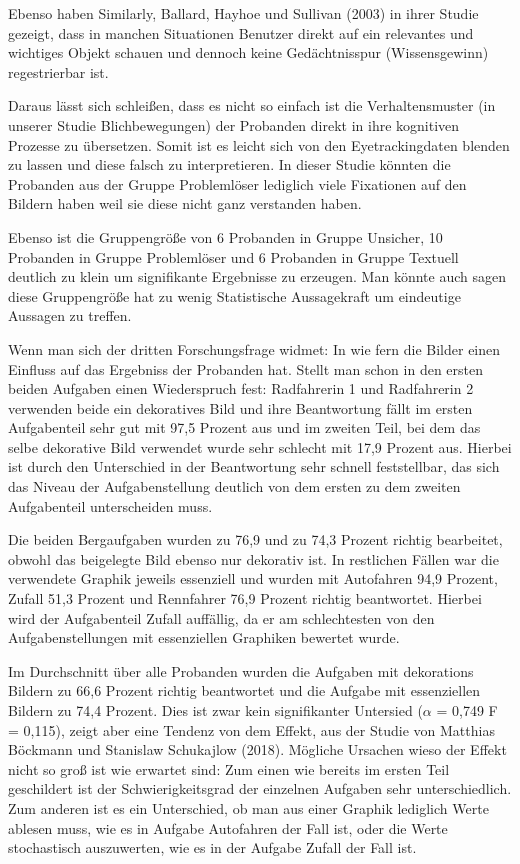 Ebenso haben Similarly, Ballard, Hayhoe und Sullivan (2003) in ihrer Studie gezeigt, dass in manchen Situationen Benutzer direkt auf ein relevantes und wichtiges Objekt schauen und dennoch keine Gedächtnisspur (Wissensgewinn) regestrierbar ist. 

Daraus lässt sich schleißen, dass es nicht so einfach ist die Verhaltensmuster (in unserer Studie Blichbewegungen) der Probanden direkt in ihre kognitiven Prozesse zu übersetzen. Somit ist es leicht sich von den Eyetrackingdaten blenden zu lassen und diese falsch zu interpretieren. In dieser Studie könnten die Probanden aus der Gruppe Problemlöser lediglich viele Fixationen auf den Bildern haben weil sie diese nicht ganz verstanden haben. 

Ebenso ist die Gruppengröße von 6 Probanden in Gruppe Unsicher, 10 Probanden in Gruppe Problemlöser und 6 Probanden in Gruppe Textuell deutlich zu klein um signifikante Ergebnisse zu erzeugen. Man könnte auch sagen diese Gruppengröße hat zu wenig Statistische Aussagekraft um eindeutige Aussagen zu treffen. 

Wenn man sich der dritten Forschungsfrage widmet: In wie fern die Bilder einen Einfluss auf das Ergebniss der Probanden hat. Stellt man schon in den ersten beiden Aufgaben einen Wiederspruch fest: Radfahrerin 1 und Radfahrerin 2 verwenden beide ein dekoratives Bild und ihre Beantwortung fällt im ersten Aufgabenteil sehr gut mit 97,5 Prozent aus und im zweiten Teil, bei dem das selbe dekorative Bild verwendet wurde sehr schlecht mit 17,9 Prozent aus. Hierbei ist durch den Unterschied in der Beantwortung sehr schnell feststellbar, das sich das Niveau der Aufgabenstellung deutlich von dem ersten zu dem zweiten Aufgabenteil unterscheiden muss.

Die beiden Bergaufgaben wurden zu 76,9 und zu 74,3 Prozent richtig bearbeitet, obwohl das beigelegte Bild ebenso nur dekorativ ist. In restlichen Fällen war die verwendete Graphik jeweils essenziell und wurden mit Autofahren 94,9 Prozent, Zufall 51,3 Prozent und Rennfahrer 76,9 Prozent richtig beantwortet. Hierbei wird der Aufgabenteil Zufall auffällig, da er am schlechtesten von den Aufgabenstellungen mit essenziellen Graphiken bewertet wurde. 

Im Durchschnitt über alle Probanden wurden die Aufgaben mit dekorations Bildern zu 66,6 Prozent richtig beantwortet und die Aufgabe mit essenziellen Bildern zu 74,4 Prozent. Dies ist zwar kein signifikanter Untersied ($\alpha$ = 0,749 F = 0,115), zeigt aber eine Tendenz von dem  Effekt, aus der Studie von Matthias Böckmann und Stanislaw Schukajlow (2018). Mögliche Ursachen wieso der Effekt nicht so groß ist wie erwartet sind: Zum einen wie bereits im ersten Teil geschildert ist der Schwierigkeitsgrad der einzelnen Aufgaben sehr unterschiedlich. Zum anderen ist es ein Unterschied, ob man aus einer Graphik lediglich Werte ablesen muss, wie es in Aufgabe Autofahren der Fall ist, oder die Werte stochastisch auszuwerten, wie es in der Aufgabe Zufall der Fall ist. 

